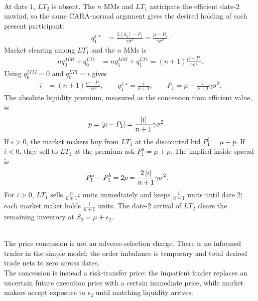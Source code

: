 \begin{model}
\par\smallskip\noindent{}\\
At date $1$, $LT_2$ is absent. The $n$ MMs and $LT_1$ anticipate the efficient date-$2$ unwind, so the same CARA-normal argument gives the desired holding of each present participant:
\begin{align*}
q_1^{j,\star}&=\frac{\mathbb{E}[S_2]-P_1}{\gamma\sigma^2}=\frac{\mu-P_1}{\gamma\sigma^2}.
\end{align*}
Market clearing among $LT_1$ and the $n$ MMs is
\begin{align*}
nq_0^{MM}+q_0^{LT1}
&=nq_1^{MM}+q_1^{LT1}=(n+1)\frac{\mu-P_1}{\gamma\sigma^2}.
\end{align*}
Using $q_0^{MM}=0$ and $q_0^{LT1}=i$ gives
\begin{align*}
i&=(n+1)\frac{\mu-P_1}{\gamma\sigma^2}, \qquad q_1^{j,\star}=\frac{i}{n+1}, \qquad P_1=\mu-\frac{i}{n+1}\gamma\sigma^2.
\end{align*}
The absolute liquidity premium, measured as the concession from efficient value, is
\begin{align*}
p&=\left\lvert\mu-P_1\right\rvert=\frac{\left\lvert i\right\rvert}{n+1}\gamma\sigma^2.
\end{align*}
If $i>0$, the market makers buy from $LT_1$ at the discounted bid $P_1^b=\mu-p$. If $i<0$, they sell to $LT_1$ at the premium ask $P_1^a=\mu+p$. The implied inside spread is
\begin{align*}
P_1^a-P_1^b&=2p=\frac{2\left\lvert i\right\rvert}{n+1}\gamma\sigma^2.
\end{align*}
For $i>0$, $LT_1$ sells $\frac{n}{n+1}i$ units immediately and keeps $\frac{i}{n+1}$ units until date $2$; each market maker holds $\frac{i}{n+1}$ units. The date-$2$ arrival of $LT_2$ clears the remaining inventory at $S_2=\mu+\epsilon_2$.

\par\smallskip\noindent{}\\
The price concession is not an adverse-selection charge. There is no informed trader in the simple model; the order imbalance is temporary and total desired trade nets to zero across dates.\\
The concession is instead a risk-transfer price: the impatient trader replaces an uncertain future execution price with a certain immediate price, while market makers accept exposure to $\epsilon_2$ until matching liquidity arrives.


\end{model}
